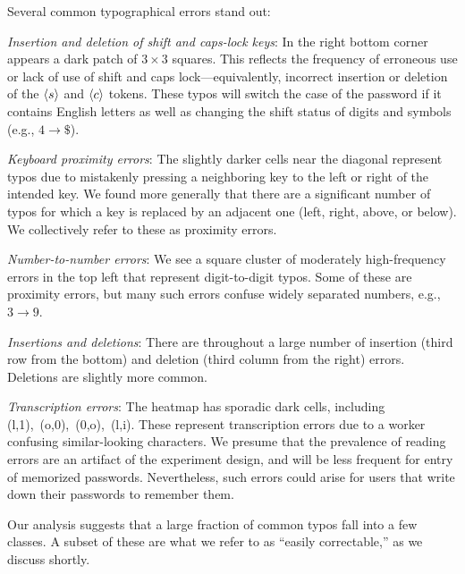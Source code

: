 Several common typographical errors stand out:
\begin{newitemize} 
\item \emph{Insertion and deletion of shift and caps-lock keys}: In the right
  bottom corner appears a dark patch of $3\times3$ squares. This reflects the
  frequency of erroneous use or lack of use of shift and caps
  lock---equivalently, incorrect insertion or deletion of the $\langle s \rangle$ and
  $\langle c \rangle$ tokens.  These typos will switch the case of the password if it
  contains English letters as well as changing the shift status of digits and
  symbols (e.g., $4\rightarrow \$$).

%
\item\emph{Keyboard proximity errors}: The slightly darker cells near
  the diagonal represent typos due to mistakenly pressing a
  neighboring key to the left or right of the intended key.  
  We found more generally that there are a significant number of typos for which a key is
replaced by an adjacent one (left, right, above, or below).
  We collectively refer to these as proximity errors.

\item \emph{Number-to-number errors}: We see a
  square cluster of moderately high-frequency errors in the top left that represent digit-to-digit typos. Some of these are
  proximity errors, but many such errors confuse
  widely separated numbers, e.g., $3\rightarrow 9$.
  
\item \emph{Insertions and deletions}: There are throughout a large
  number of insertion (third row from the bottom) and deletion (third
  column from the right) errors. Deletions are slightly more common.
\item\emph{Transcription errors}: The heatmap has sporadic dark cells, including
  \mbox{(l,1), (o,0), (0,o), (l,i)}. These represent transcription
  errors due to a worker confusing similar-looking characters. We presume that 
  the prevalence of reading errors are an artifact of the experiment design, and will be less frequent for entry of memorized passwords.
  Nevertheless, such errors could arise for users that write down 
  their passwords to remember them.
\end{newitemize}
Our analysis suggests that a large fraction of common typos fall into a few
classes. A subset of these are what we refer to as ``easily correctable,'' as we
discuss shortly.

